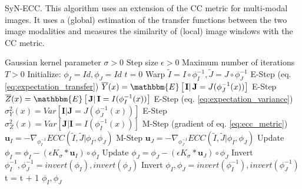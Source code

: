 \begin{algorithm}[h!]
\caption{SyN-ECC. This algorithm uses an extension of the CC metric for multi-modal images. It uses a (global) estimation of the transfer functions between the two image modalities and measures the similarity of (local) image windows with the CC metric.}\label{alg:SyNECC}
\begin{algorithmic}[1]
\REQUIRE Gaussian kernel parameter $\sigma>0$
\REQUIRE Step size $\epsilon>0$
\REQUIRE Maximum number of iterations $T>0$
\STATE Initialize: $\phi_{I} = Id, \phi_{J} = Id$
\STATE $t=0$
\REPEAT
    \STATE Warp $\tilde{I}  = I \circ \phi_{I}^{-1}, \tilde{J} = J \circ \phi_{J}^{-1}$
    \STATE E-Step (eq. \eqref{eq:expectation_transfer}) $\overline{Y}(x) = \mathbbm{E}\left[\left.\mathbf{I}\right| \mathbf{J}= J(\phi_{J}^{-1}(x))\right]$
    \STATE E-Step $\overline{Z}(x) = \mathbbm{E}\left[\left.\mathbf{J}\right| \mathbf{I}= I(\phi_{I}^{-1}(x))\right]$
    \STATE E-Step (eq. \eqref{eq:expectation_variance}) $\sigma^{2}_{Y}(x) = Var\left[\left.\mathbf{I}\right| \mathbf{J}= J(\phi_{J}^{-1}(x))\right]$
    \STATE E-Step $\sigma^{2}_{Z}(x) = Var\left[\left.\mathbf{J}\right| \mathbf{I}= I(\phi_{I}^{-1}(x))\right]$
    \STATE M-Step (gradient of eq. \eqref{eq:ecc_metric}) $\mathbf{u}_{I} = - \nabla_{\phi^{-1}_{I}} ECC(\tilde{I}, \tilde{J} | \phi_{I}, \phi_{J})$
    \STATE M-Step $\mathbf{u}_{J} = - \nabla_{\phi^{-1}_{J}} ECC(\tilde{I}, \tilde{J} | \phi_{I}, \phi_{J})$
    \STATE Update $\phi_{I} = \phi_{I} - \left(\epsilon K_{\sigma} \ast \mathbf{u}_{I} \right)\circ \phi_{I}$
    \STATE Update $\phi_{J} = \phi_{J} - \left(\epsilon K_{\sigma} \ast \mathbf{u}_{J} \right)\circ \phi_{J}$
    \STATE Invert $\phi_{I}^{-1}, \phi_{J}^{-1} = invert(\phi_{I}), invert(\phi_{J})$
    \STATE Invert $\phi_{I}, \phi_{J} = invert(\phi_{I}^{-1}), invert(\phi_{J}^{-1})$
    \STATE t = t + 1
\RETURN $\phi_{I}, \phi_{J}$
\end{algorithmic}
\end{algorithm} 